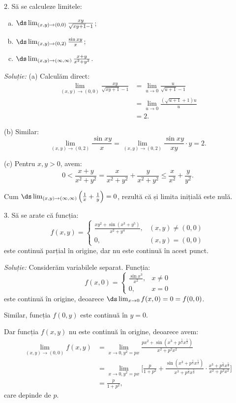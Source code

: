 2. Să se calculeze limitele:
\begin{enumerate}[(a)]
\item $\ds\lim_{(x, y) \to (0, 0)} \frac{xy}{\sqrt{xy + 1} - 1}$;
\item $\ds\lim_{(x, y) \to (0, 2)} \frac{\sin xy}{x}$;
\item $\ds\lim_{(x, y) \to (\infty, \infty)} \frac{x + y}{x^2 + y^2}$.
\end{enumerate}

\emph{Soluție:} (a) Calculăm direct:
\begin{align*}
  \lim_{(x, y) \to (0, 0)} \frac{xy}{\sqrt{xy + 1} - 1} &= \lim_{u \to 0} \frac{u}{\sqrt{u + 1} - 1} \\
                                                        &= \lim_{u \to 0} \frac{(\sqrt{u + 1} + 1)u}{u}\\
                                                        &= 2.
\end{align*}

(b) Similar:
\[
  \lim_{(x, y) \to (0, 2)} \frac{\sin xy}{x} = \lim_{(x, y) \to (0, 2)} \frac{\sin xy}{xy} \cdot y = 2.
\]

(c) Pentru $x, y > 0$, avem:
\[
  0 < \frac{x + y}{x^2 + y^2} = \frac{x}{x^2 + y^2} + \frac{y}{x^2 + y^2} \leq \frac{x}{x^2} + \frac{y}{y^2}.
\]

Cum $\ds\lim_{(x, y) \to (\infty, \infty)} \Big( \frac{1}{x} + \frac{1}{y} \Big) = 0$, rezultă
că și limita inițială este nulă.

\vspace{1cm}

3. Să se arate că funcția:
\[
  f(x, y) = \begin{cases}
    \frac{xy^2 + \sin(x^3 + y^5)}{x^2 + y^4}, & (x, y) \neq (0, 0) \\
    0, & (x, y) = (0, 0)
  \end{cases}
\]
este continuă parțial în origine, dar nu este continuă în acest punct.

\emph{Soluție:} Considerăm variabilele separat. Funcția:
\[
  f(x, 0) = \begin{cases}
    \frac{\sin x^3}{x^2}, & x \neq 0 \\
    0, & x = 0
  \end{cases}
\]
este continuă în origine, deoarece $\ds\lim_{x \to 0} f(x, 0) = 0 = f(0, 0)$.

Similar, funcția $f(0, y)$ este continuă în $y = 0$.

Dar funcția $f(x, y)$ nu este continuă în origine, deoarece avem:
\begin{align*}
  \lim_{(x, y) \to (0, 0)} f(x, y) &= \lim_{x \to 0, y^2 = px} \frac{px^2 + \sin(x^3 + p^\frac{5}{2} x^{\frac{5}{2}})}{x^2 + p^2 x^2} \\
                                   &= \lim_{x \to 0, y^2 = px} \Bigg[ \frac{p}{1 + p^2} + %
                                     \frac{\sin(x^3 + p^{\frac{5}{2}} x^{\frac{5}{2}})}{x^3 + p^{\frac{5}{2}} x^{\frac{5}{2}}} \cdot %
                                     \frac{x^3 + p^{\frac{5}{2}} x^{\frac{5}{2}}}{x^2 + p^2 x^2} \Bigg] \\
                                   &= \frac{p}{1 + p^2},
\end{align*}
care depinde de $p$.

